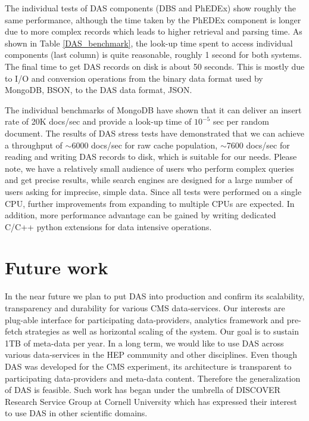 \documentclass[3p,times]{elsarticle}
\begin{document}
The individual tests of DAS components (DBS and PhEDEx) show roughly 
the same performance, although the time taken by the PhEDEx component is longer
due to more complex records which leads to higher retrieval and parsing time. 
As shown in Table \ref{DAS_benchmark},
the look-up time spent to access individual components (last column) is quite
reasonable, roughly 1 second for both systems. The final time to
get DAS records on disk is about 50 seconds. This is mostly due to I/O and
conversion operations from the binary data format used by MongoDB, BSON, 
to the DAS data format, JSON.

The individual benchmarks of MongoDB have shown that it can deliver an insert rate of
20K docs/sec and provide a look-up time of $10^{-5}$ sec per random document.
The results of DAS stress tests have demonstrated that we can achieve a throughput of
$\sim$6000 docs/sec for raw cache population, 
$\sim$7600 docs/sec for reading and writing DAS records to disk,
which is suitable for our needs. 
Please note, we have a relatively small audience of users
who perform complex queries and get precise results, while search 
engines are designed for a large number of users asking for imprecise, simple data.
Since all tests were performed on a single CPU, further improvements from
expanding to multiple CPUs are expected. In addition, more
performance advantage can be gained by writing dedicated C/C++
python extensions for data intensive operations.

\section{Future work}
In the near future we plan to put DAS into production and confirm its scalability, 
transparency and durability for various CMS data-services. 
Our interests are plug-able interface for participating data-providers,
analytics framework and pre-fetch strategies as well as horizontal scaling of the
system. Our goal is to sustain 1TB of meta-data per year. 
In a long term, we would like to use DAS across various
data-services in the HEP community and other disciplines. Even though DAS was developed
for the CMS experiment, its architecture is transparent to participating 
data-providers and meta-data content. Therefore the generalization of DAS is feasible.
Such work has began under the umbrella of DISCOVER Research Service Group at 
Cornell University \cite{DRSG} which has expressed their interest to use DAS in other 
scientific domains.
\end{document}
